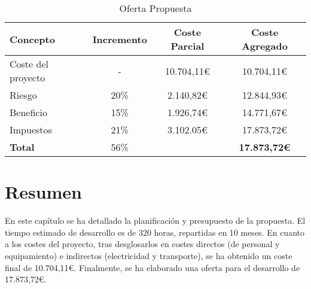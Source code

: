 \begin{table}[H]
    \begin{tabular}{@{}lccc@{}}
        \toprule
        \textbf{Concepto} & \textbf{Incremento} & \textbf{Coste Parcial} & \textbf{Coste} \textbf{Agregado}\\
        \midrule
        Coste del proyecto & -    & 10.704,11\euro & 10.704,11\euro \\
        Riesgo             & 20\% &  2.140,82\euro & 12.844,93\euro \\
        Beneficio          & 15\% &  1.926,74\euro & 14.771,67\euro \\
        Impuestos          & 21\% &  3.102.05\euro & 17.873,72\euro\\
        \midrule
        \textbf{Total}     & 56\% &        & \textbf{17.873,72\euro}\\
        \bottomrule
    \end{tabular}
    \caption{Oferta Propuesta}\label{tab:offer}
\end{table}

\section{Resumen}

En este capítulo se ha detallado la planificación y presupuesto de la propuesta. El tiempo estimado de desarrollo es de 320 horas, repartidas en 10 meses. En cuanto a los costes del proyecto, tras desglosarlos en costes directos (de personal y equipamiento) e indirectos (electricidad y transporte), se ha obtenido un coste final de 10.704,11\euro. Finalmente, se ha elaborado una oferta para el desarrollo de 17.873,72\euro.
